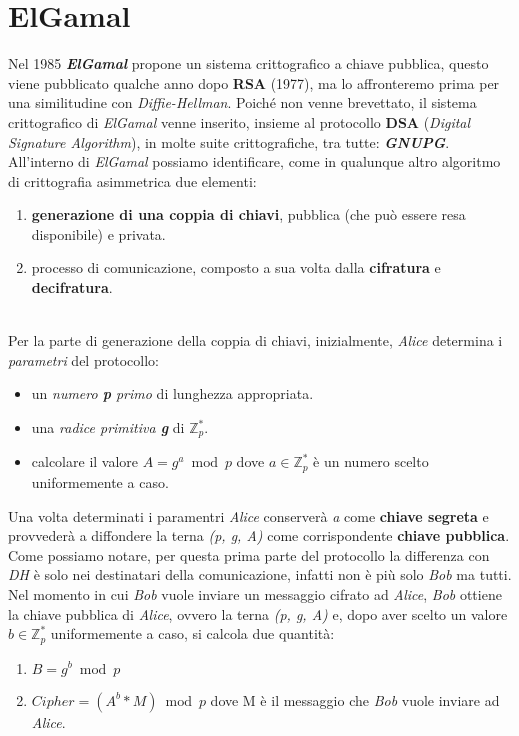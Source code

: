 \section{ElGamal}
Nel 1985 \textbf{\textit{ElGamal}} propone un sistema crittografico a chiave pubblica, questo viene pubblicato qualche anno dopo \textbf{RSA} (1977), ma lo affronteremo prima per una similitudine con \textit{Diffie-Hellman}. Poiché non venne brevettato, il sistema crittografico di \textit{ElGamal} venne inserito, insieme al protocollo \textbf{DSA} (\textit{Digital Signature Algorithm}), in molte suite crittografiche, tra tutte: \textbf{\textit{GNUPG}}. All'interno di \textit{ElGamal} possiamo identificare, come in qualunque altro algoritmo di crittografia asimmetrica due elementi:
\begin{enumerate}
    \item \textbf{generazione di una coppia di chiavi}, pubblica (che può essere resa disponibile) e privata.
    \item processo di comunicazione, composto a sua volta dalla \textbf{cifratura} e \textbf{decifratura}.
\end{enumerate}
\   \\
Per la parte di generazione della coppia di chiavi, inizialmente, \textit{Alice} determina i \textit{parametri} del protocollo:
\begin{itemize}
    \item un \textit{numero \textbf{p} primo} di lunghezza appropriata.
    \item una \textit{radice primitiva \textbf{g}} di $\mathbb{Z}_p^*$.
    \item calcolare il valore $A = g^a \bmod p$ dove $a \in \mathbb{Z}_p^*$ è un numero scelto uniformemente a caso.
\end{itemize}
Una volta determinati i paramentri \textit{Alice} conserverà \textit{a} come \textbf{chiave segreta} e provvederà a diffondere la terna \textit{(p, g, A)} come corrispondente \textbf{chiave pubblica}. Come possiamo notare, per questa prima parte del protocollo la differenza con \textit{DH} è solo nei destinatari della comunicazione, infatti non è più solo \textit{Bob} ma tutti. Nel momento in cui \textit{Bob} vuole inviare un messaggio cifrato ad \textit{Alice}, \textit{Bob} ottiene la chiave pubblica di \textit{Alice}, ovvero la terna \textit{(p, g, A)} e, dopo aver scelto un valore $b \in \mathbb{Z}_p^*$ uniformemente a caso, si calcola due quantità:
\begin{enumerate}
    \item $B = g^b \bmod p$
    \item $Cipher = (A^b * M) \bmod p$ dove M è il messaggio che \textit{Bob} vuole inviare ad \textit{Alice}.
\end{enumerate}
